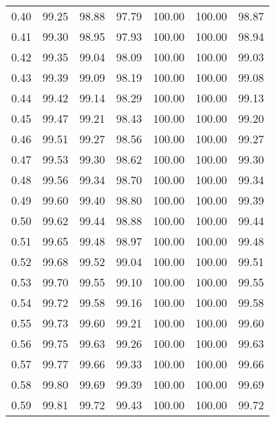 \begin{tabular}{|c|c|c|c|c|c|c|}
      0.40 &     99.25 &     98.88 &      97.79 &  100.00 &     100.00 &         98.87 \\
      0.41 &     99.30 &     98.95 &      97.93 &  100.00 &     100.00 &         98.94 \\
      0.42 &     99.35 &     99.04 &      98.09 &  100.00 &     100.00 &         99.03 \\
      0.43 &     99.39 &     99.09 &      98.19 &  100.00 &     100.00 &         99.08 \\
      0.44 &     99.42 &     99.14 &      98.29 &  100.00 &     100.00 &         99.13 \\
      0.45 &     99.47 &     99.21 &      98.43 &  100.00 &     100.00 &         99.20 \\
      0.46 &     99.51 &     99.27 &      98.56 &  100.00 &     100.00 &         99.27 \\
      0.47 &     99.53 &     99.30 &      98.62 &  100.00 &     100.00 &         99.30 \\
      0.48 &     99.56 &     99.34 &      98.70 &  100.00 &     100.00 &         99.34 \\
      0.49 &     99.60 &     99.40 &      98.80 &  100.00 &     100.00 &         99.39 \\
      0.50 &     99.62 &     99.44 &      98.88 &  100.00 &     100.00 &         99.44 \\
      0.51 &     99.65 &     99.48 &      98.97 &  100.00 &     100.00 &         99.48 \\
      0.52 &     99.68 &     99.52 &      99.04 &  100.00 &     100.00 &         99.51 \\
      0.53 &     99.70 &     99.55 &      99.10 &  100.00 &     100.00 &         99.55 \\
      0.54 &     99.72 &     99.58 &      99.16 &  100.00 &     100.00 &         99.58 \\
      0.55 &     99.73 &     99.60 &      99.21 &  100.00 &     100.00 &         99.60 \\
      0.56 &     99.75 &     99.63 &      99.26 &  100.00 &     100.00 &         99.63 \\
      0.57 &     99.77 &     99.66 &      99.33 &  100.00 &     100.00 &         99.66 \\
      0.58 &     99.80 &     99.69 &      99.39 &  100.00 &     100.00 &         99.69 \\
      0.59 &     99.81 &     99.72 &      99.43 &  100.00 &     100.00 &         99.72 \\

\end{tabular}
